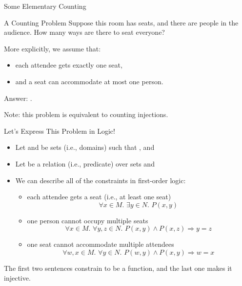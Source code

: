 \documentclass{beamer}
\begin{document}
\begin{frame}{Some Elementary Counting}
  \begin{exampleblock}{A Counting Problem}
    Suppose this room has  seats, and there are
     people in the audience. How many ways are there to
    seat everyone?
  \end{exampleblock}

  \pause
  More explicitly, we assume that:
  \begin{itemize}
  \item each attendee gets exactly one seat,
  \item and a seat can accommodate at most one person.
  \end{itemize}

  \pause
  \alert{Answer:} .

  Note: this problem is equivalent to counting \structure{$[m] \to [n]$} injections.

\end{frame}

\begin{frame}{Let's Express This Problem in Logic!}
  \begin{itemize}
  \item Let  and  be sets (i.e., \alert{domains}) such that , and 
  \item Let  be a relation (i.e., \alert{predicate}) over sets  and 
  \item We can describe all of the constraints in first-order logic:
    \begin{itemize}
    \item \pause each attendee gets a seat (i.e., at least one seat)
      \[
      \forall x \in M\text{. }\exists y \in N\text{. }P(x, y)
      \]
    \item \pause one person cannot occupy multiple seats
      \[
      \forall x \in M\text{. }\forall y, z \in N\text{. }P(x, y) \land P(x, z) \Rightarrow y=z
      \]
    \item \pause one seat cannot accommodate multiple attendees
      \[
      \forall w, x \in M\text{. }\forall y \in N\text{. }P(w, y) \land P(x, y) \Rightarrow w=x
      \]
    \end{itemize}
  \end{itemize}
  \pause
  The first two sentences constrain  to be a function, and the last one makes it injective.
\end{frame}
\end{document}
